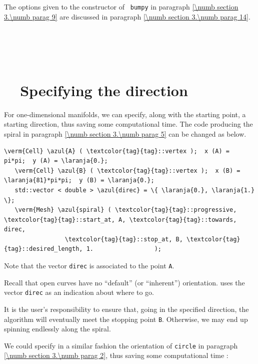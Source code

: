 The options given to the constructor of {\small\tt {} bumpy} in paragraph
\ref{\numb section 3.\numb parag 9} are discussed in paragraph
\ref{\numb section 3.\numb parag 14}.


\section{~~\cinza{[empty]}}\label{\numb section 3.\numb parag 11}


\section{~~Specifying the direction}\label{\numb section 3.\numb parag 12}

For one-dimensional manifolds, we can specify, along with the starting point,
a starting direction, thus saving some computational time.
The code producing the spiral in paragraph \ref{\numb section 3.\numb parag 5}
can be changed as below.

\begin{Verbatim}[commandchars=\\\{\},formatcom=\small\tt,
   baselinestretch=0.94,framesep=2mm                     ]
   \verm{Cell} \azul{A} ( \textcolor{tag}{tag}::vertex );  x (A) =    pi*pi;  y (A) = \laranja{0.};
   \verm{Cell} \azul{B} ( \textcolor{tag}{tag}::vertex );  x (B) = \laranja{81}*pi*pi;  y (B) = \laranja{0.};
   std::vector < double > \azul{direc} = \{ \laranja{0.}, \laranja{1.} \};
   \verm{Mesh} \azul{spiral} ( \textcolor{tag}{tag}::progressive, \textcolor{tag}{tag}::start_at, A, \textcolor{tag}{tag}::towards, direc,
                 \textcolor{tag}{tag}::stop_at, B, \textcolor{tag}{tag}::desired_length, 1.                 );
\end{Verbatim}

Note that the vector {\small\tt direc} is associated to the point {\small\tt A}.

Recall that open curves have no ``default'' (or ``inherent'') orientation.
{\ManiFEM} uses the vector {\small\tt direc} as an indication about where to go.

It is the user's responsibility to ensure that, going in the specified direction,
the algorithm will eventually meet the stopping point {\small\tt B}.
Otherwise, we may end up spinning endlessly along the spiral.

We could specify in a similar fashion the orientation of {\small\tt circle} in paragraph
\ref{\numb section 3.\numb parag 2}, thus saving some computational time :


